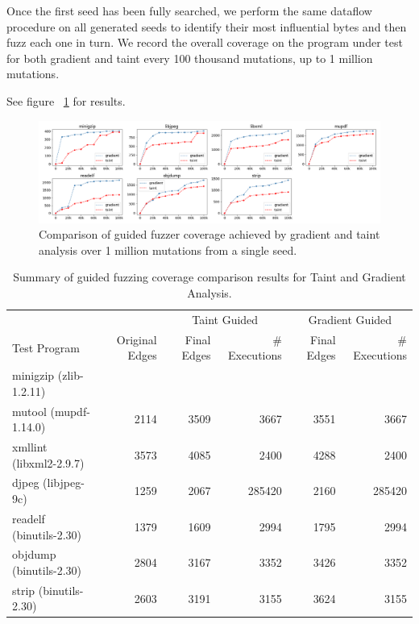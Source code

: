 Once the first seed has been fully searched, we perform the same dataflow procedure on all generated seeds to identify their most influential bytes and then fuzz each one in turn. We record the overall coverage on the program under test for both gradient and taint every 100 thousand mutations, up to 1 million mutations.

See figure ~\ref{fig:fuzz_comp} for results. 

\begin{figure}[t]
  \centering
  \includegraphics[width=\linewidth]{figs/fuzz_comp_plot}
  \vspace{-10pt}
   \caption{ \label{fig:fuzz_comp}Comparison of guided fuzzer coverage achieved by gradient and taint analysis over 1 million mutations from a single seed.}
  \vspace{-10pt}
\end{figure}


\begin{table}[t]
\centering
  \begin{tabular}{l r rr rr} 
 \toprule
    & & \multicolumn{2}{c}{Taint Guided} & \multicolumn{2}{c}{Gradient Guided} \\ 
    \cmidrule(r){3-4} \cmidrule(r){5-6}
    Test Program & Original Edges  & Final Edges & \# Executions &  Final Edges & \# Executions\\ 
 \midrule
   minigzip (zlib-1.2.11)  &      &  &  &  &   \\ 
   mutool (mupdf-1.14.0)   & 2114     & 3509 & 3667  & 3551 & 3667  \\
   xmllint (libxml2-2.9.7) & 3573      &   4085   & 2400   &   4288   &  2400      \\
   djpeg (libjpeg-9c)      & 1259     & 2067     &   285420    & 2160 & 285420 \\  
   readelf (binutils-2.30) & 1379      & 1609  & 2994 & 1795  & 2994  \\  
   objdump (binutils-2.30) & 2804     & 3167 &3352  & 3426 & 3352  \\  
   strip   (binutils-2.30) & 2603     & 3191 & 3155 & 3624 & 3155  \\  
 \bottomrule
 \end{tabular}
  \caption{\label{tab:fuzzer_comp}Summary of guided fuzzing coverage comparison results for Taint and Gradient Analysis. }
\end{table}

